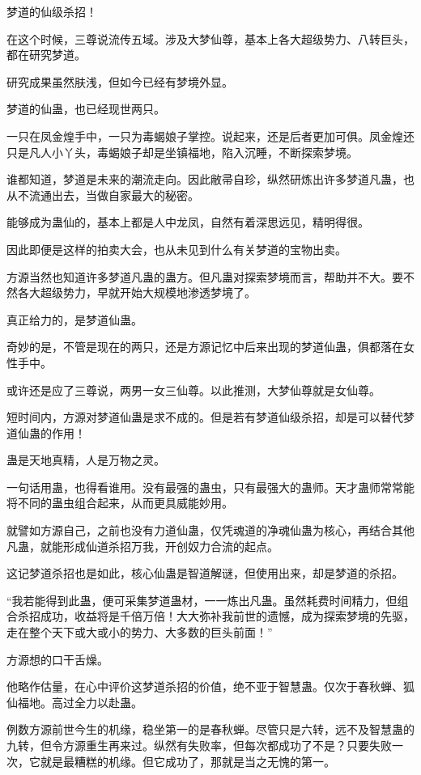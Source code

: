 \begin{this_body}
梦道的仙级杀招！

在这个时候，三尊说流传五域。涉及大梦仙尊，基本上各大超级势力、八转巨头，都在研究梦道。

研究成果虽然肤浅，但如今已经有梦境外显。

梦道的仙蛊，也已经现世两只。

一只在凤金煌手中，一只为毒蝎娘子掌控。说起来，还是后者更加可俱。凤金煌还只是凡人小丫头，毒蝎娘子却是坐镇福地，陷入沉睡，不断探索梦境。

谁都知道，梦道是未来的潮流走向。因此敝帚自珍，纵然研炼出许多梦道凡蛊，也从不流通出去，当做自家最大的秘密。

能够成为蛊仙的，基本上都是人中龙凤，自然有着深思远见，精明得很。

因此即便是这样的拍卖大会，也从未见到什么有关梦道的宝物出卖。

方源当然也知道许多梦道凡蛊的蛊方。但凡蛊对探索梦境而言，帮助并不大。要不然各大超级势力，早就开始大规模地渗透梦境了。

真正给力的，是梦道仙蛊。

奇妙的是，不管是现在的两只，还是方源记忆中后来出现的梦道仙蛊，俱都落在女性手中。

或许还是应了三尊说，两男一女三仙尊。以此推测，大梦仙尊就是女仙尊。

短时间内，方源对梦道仙蛊是求不成的。但是若有梦道仙级杀招，却是可以替代梦道仙蛊的作用！

蛊是天地真精，人是万物之灵。

一句话用蛊，也得看谁用。没有最强的蛊虫，只有最强大的蛊师。天才蛊师常常能将不同的蛊虫组合起来，从而更具威能妙用。

就譬如方源自己，之前也没有力道仙蛊，仅凭魂道的净魂仙蛊为核心，再结合其他凡蛊，就能形成仙道杀招万我，开创奴力合流的起点。

这记梦道杀招也是如此，核心仙蛊是智道解谜，但使用出来，却是梦道的杀招。

“我若能得到此蛊，便可采集梦道蛊材，一一炼出凡蛊。虽然耗费时间精力，但组合杀招成功，收益将是千倍万倍！大大弥补我前世的遗憾，成为探索梦境的先驱，走在整个天下或大或小的势力、大多数的巨头前面！”

方源想的口干舌燥。

他略作估量，在心中评价这梦道杀招的价值，绝不亚于智慧蛊。仅次于春秋蝉、狐仙福地。高过全力以赴蛊。

例数方源前世今生的机缘，稳坐第一的是春秋蝉。尽管只是六转，远不及智慧蛊的九转，但令方源重生再来过。纵然有失败率，但每次都成功了不是？只要失败一次，它就是最糟糕的机缘。但它成功了，那就是当之无愧的第一。


\end{this_body}
